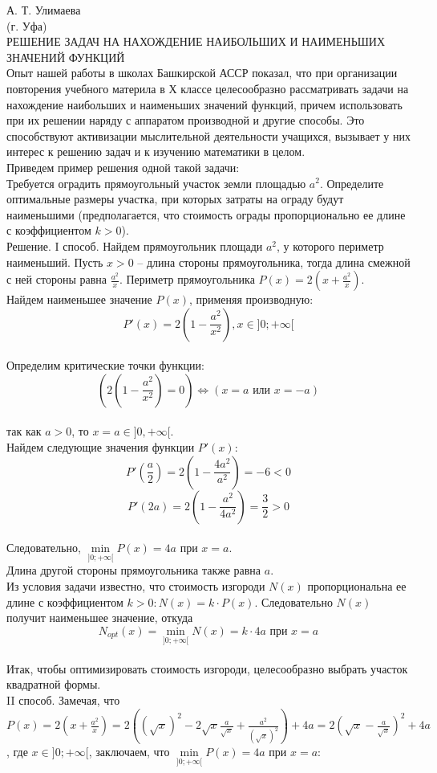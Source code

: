 \documentclass{article}
\begin{document}
А. Т. Улимаева
\\(г. Уфа)
\\РЕШЕНИЕ ЗАДАЧ НА НАХОЖДЕНИЕ НАИБОЛЬШИХ И НАИМЕНЬШИХ ЗНАЧЕНИЙ ФУНКЦИЙ
\\Опыт нашей работы в школах Башкирской АССР показал, что при организации повторения учебного материла в Х классе целесообразно рассматривать задачи на нахождение наибольших и наименьших значений функций, причем использовать при их решении наряду с аппаратом производной и другие способы. Это способствуют активизации мыслительной деятельности учащихся, вызывает у них интерес к решению задач и к изучению математики в целом.
\\Приведем пример решения одной такой задачи:
\\Требуется оградить прямоугольный участок земли площадью $a^2$. Определите оптимальные размеры участка, при которых затраты на ограду будут наименьшими (предполагается, что стоимость ограды пропорционально ее длине с коэффициентом $k>0$).
\\Решение. I способ. Найдем прямоугольник площади $a^2$, у которого периметр наименьший. Пусть $x>0$ -- длина стороны прямоугольника, тогда длина смежной с ней стороны равна $\frac{a^2}{x}$. Периметр прямоугольника $P(x)=2(x+\frac{a^2}{x})$.
\\Найдем наименьшее значение $P(x)$, применяя производную:
$$P'(x)=2(1-\frac{a^2}{x^2}), x\in]0;+\infty[$$
\\Определим критические точки функции:
$$(2(1-\frac{a^2}{x^2})=0)\Leftrightarrow(x=a\mbox{ или }x=-a)$$
\\так как $a>0$, то $x=a\in]0,+\infty[$.
\\Найдем следующие значения функции $P'(x)$:
$$P'(\frac{a}{2})=2(1-\frac{4a^2}{a^2})=-6<0$$
$$P'(2a)=2(1-\frac{a^2}{4a^2})=\frac{3}{2}>0$$
\\Следовательно, $\min\limits_{]0;+\infty[}P(x)=4a$ при $x=a$.
\\Длина другой стороны прямоугольника также равна $a$.
\\Из условия задачи известно, что стоимость изгороди $N(x)$ пропорциональна ее длине с коэффициентом $k>0:N(x)=k\cdot P(x)$. Следовательно $N(x)$ получит наименьшее значение, откуда 
$$N_{opt}(x)=\min\limits_{]0;+\infty[}N(x)=k\cdot4a\mbox{ при }x=a$$
\\Итак, чтобы оптимизировать стоимость изгороди, целесообразно выбрать участок квадратной формы.
\\II способ. Замечая, что $P(x)=2(x+\frac{a^2}{x})=2((\sqrt{x})^2-2\sqrt{x}\frac{a}{\sqrt{x}}+\frac{a^2}{(\sqrt{x})^2})+4a=2(\sqrt{x}-\frac{a}{\sqrt{x}})^2+4a$, где $x\in]0;+\infty[$, заключаем, что $\min\limits_{]0;+\infty[}P(x)=4a$ при $x=a$:
\end{document}
